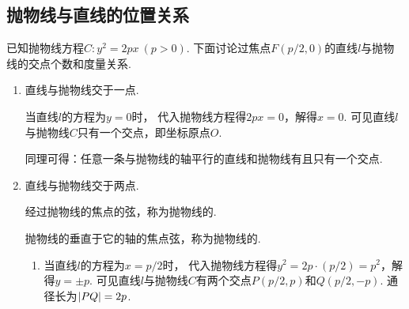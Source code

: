 \subsection{抛物线与直线的位置关系}
已知抛物线方程\(C: y^2=2px\ (p>0)\).
下面讨论过焦点\(F(p/2,0)\)的直线\(l\)与抛物线的交点个数和度量关系.
\begin{enumerate}
	\item 直线与抛物线交于一点.

	当直线\(l\)的方程为\(y=0\)时，
	代入抛物线方程得\(2px = 0\)，解得\(x=0\).
	可见直线\(l\)与抛物线\(C\)只有一个交点，即坐标原点\(O\).

	同理可得：任意一条与抛物线的轴平行的直线和抛物线有且只有一个交点.

	\item 直线与抛物线交于两点.

	经过抛物线的焦点的弦，称为抛物线的.

	抛物线的垂直于它的轴的焦点弦，称为抛物线的.

	\begin{enumerate}
		\item 当直线\(l\)的方程为\(x=p/2\)时，
		代入抛物线方程得\(y^2=2p\cdot(p/2)=p^2\)，解得\(y=\pm p\).
		可见直线\(l\)与抛物线\(C\)有两个交点\(P(p/2,p)\)和\(Q(p/2,-p)\).
		通径长为\(\abs{PQ} = 2p\).


\end{enumerate}
\end{enumerate}
